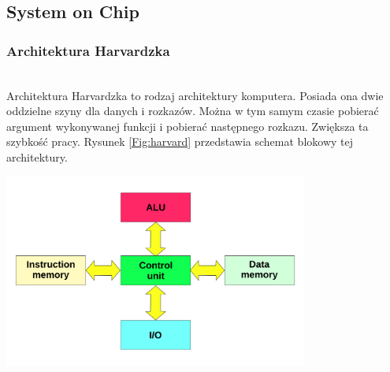 \documentclass[11pt,a4paper]{article}
\begin{document}
	\subsection{System on Chip}

		\subsubsection{Architektura Harvardzka}
		\hspace{5mm}
			\\Architektura Harvardzka to rodzaj architektury komputera. Posiada ona dwie oddzielne szyny dla danych i rozkazów. Można w tym samym czasie pobierać argument wykonywanej funkcji i pobierać następnego rozkazu. Zwiększa ta szybkość pracy. Rysunek \ref{Fig:harvard} przedstawia schemat blokowy tej architektury.\\
\begin{samepage}
\nopagebreak
\begin{center}
		\includegraphics[width=10cm]{./rysunki/Harvard_architecture.png}
		\end{center}
\end{samepage}
\end{document}
